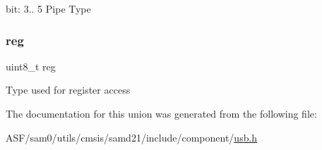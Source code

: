 bit\+: 3.. 5 Pipe Type \mbox{\label{union_u_s_b___h_o_s_t___p_c_f_g___type_a9428adc9af4653a2050e2536b55dec8d}} 
\subsubsection{\texorpdfstring{reg}{reg}}
{\footnotesize\ttfamily uint8\+\_\+t reg}

Type used for register access 

The documentation for this union was generated from the following file\+:\begin{DoxyCompactItemize}
\item 
A\+S\+F/sam0/utils/cmsis/samd21/include/component/\mbox{\hyperlink{component_2usb_8h}{usb.\+h}}\end{DoxyCompactItemize}
